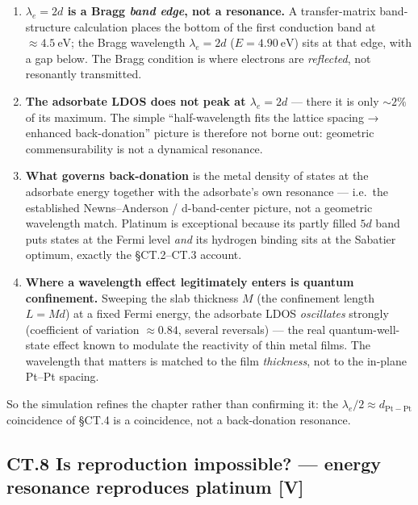 \documentclass[
  10pt,
]{article}
\providecommand{\tightlist}{%
  \setlength{\itemsep}{0pt}\setlength{\parskip}{0pt}}
\begin{document}
\begin{enumerate}
\def\labelenumi{\arabic{enumi}.}
\tightlist
\item
  \textbf{\(\lambda_e = 2d\) is a Bragg \emph{band edge}, not a
  resonance.} A transfer-matrix band-structure calculation places the
  bottom of the first conduction band at \(\approx 4.5\ \mathrm{eV}\);
  the Bragg wavelength \(\lambda_e = 2d\) (\(E = 4.90\ \mathrm{eV}\))
  sits at that edge, with a gap below. The Bragg condition is where
  electrons are \emph{reflected}, not resonantly transmitted.
\item
  \textbf{The adsorbate LDOS does not peak at \(\lambda_e = 2d\)} ---
  there it is only \(\sim 2\%\) of its maximum. The simple
  ``half-wavelength fits the lattice spacing → enhanced back-donation''
  picture is therefore not borne out: geometric commensurability is not
  a dynamical resonance.
\item
  \textbf{What governs back-donation} is the metal density of states at
  the adsorbate energy together with the adsorbate's own resonance ---
  i.e.~the established Newns--Anderson / d-band-center picture, not a
  geometric wavelength match. Platinum is exceptional because its partly
  filled \(5d\) band puts states at the Fermi level \emph{and} its
  hydrogen binding sits at the Sabatier optimum, exactly the §CT.2--CT.3
  account.
\item
  \textbf{Where a wavelength effect legitimately enters is quantum
  confinement.} Sweeping the slab thickness \(M\) (the confinement
  length \(L = Md\)) at a fixed Fermi energy, the adsorbate LDOS
  \emph{oscillates} strongly (coefficient of variation \(\approx 0.84\),
  several reversals) --- the real quantum-well-state effect known to
  modulate the reactivity of thin metal films. The wavelength that
  matters is matched to the film \emph{thickness}, not to the in-plane
  Pt--Pt spacing.
\end{enumerate}

So the simulation refines the chapter rather than confirming it: the
\(\lambda_e/2 \approx d_{\mathrm{Pt-Pt}}\) coincidence of §CT.4 is a
coincidence, not a back-donation resonance.

\hypertarget{ct.8-is-reproduction-impossible-energy-resonance-reproduces-platinum-v}{%
\subsection{\texorpdfstring{CT.8 Is reproduction impossible? --- energy
resonance reproduces platinum
\textbf{{[}V{]}}}{CT.8 Is reproduction impossible? --- energy resonance reproduces platinum {[}V{]}}}\label{ct.8-is-reproduction-impossible-energy-resonance-reproduces-platinum-v}}
\end{document}

